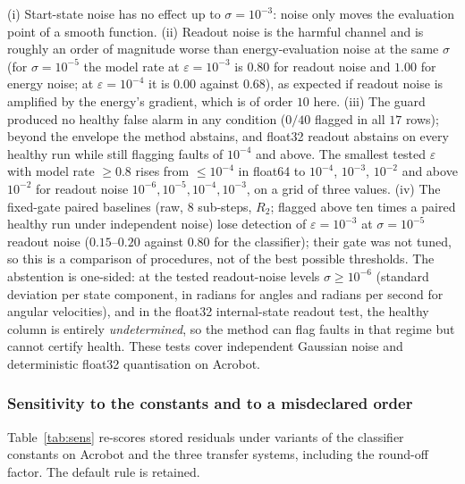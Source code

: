 \documentclass[10pt]{article}
\theoremstyle{definition}
\newcommand{\fittable}[2][\linewidth]{%
  \sbox{\tablebox}{#2}%
  \ifdim\wd\tablebox>#1\relax
    \resizebox{#1}{!}{\usebox{\tablebox}}%
  \else
    \usebox{\tablebox}%
  \fi}
\begin{document}
(i) Start-state noise has no effect up to $\sigma=10^{-3}$: noise only moves the evaluation point of a
smooth function. (ii) Readout noise is the harmful channel and is roughly an order of magnitude worse than
energy-evaluation noise at the same $\sigma$ (for $\sigma=10^{-5}$ the model rate at $\varepsilon=10^{-3}$ is $0.80$ for
readout noise and $1.00$ for energy noise; at $\varepsilon=10^{-4}$ it is $0.00$ against $0.68$), as expected if readout
noise is amplified by the energy's gradient, which is of order $10$ here. (iii) The guard produced no healthy false alarm
in any condition ($0/40$ flagged in all $17$ rows); beyond the envelope the method abstains, and float32 readout abstains
on every healthy run while still flagging faults of $10^{-4}$ and above. The smallest tested $\varepsilon$ with model rate
$\ge0.8$ rises from $\le10^{-4}$ in float64 to $10^{-4}$, $10^{-3}$, $10^{-2}$ and above $10^{-2}$ for readout noise
$10^{-6},10^{-5},10^{-4},10^{-3}$, on a grid of three values. (iv) The fixed-gate paired baselines (raw, 8 sub-steps,
$R_2$; flagged above ten times a paired healthy run under independent noise) lose detection of $\varepsilon=10^{-3}$ at
$\sigma=10^{-5}$ readout noise ($0.15$--$0.20$ against $0.80$ for the classifier); their gate was not tuned, so this is a
comparison of procedures, not of the best possible thresholds. The abstention is one-sided: at the tested readout-noise levels
$\sigma\ge10^{-6}$ (standard deviation per state component, in radians for angles
and radians per second for angular velocities), and in the float32 internal-state
readout test, the healthy column is entirely \emph{undetermined}, so the method can
flag faults in that regime but cannot certify health. These tests cover
independent Gaussian noise and deterministic float32 quantisation on Acrobot.

\subsubsection{Sensitivity to the constants and to a misdeclared order}\label{sec:sens}

Table~\ref{tab:sens} re-scores stored residuals under variants of the
classifier constants on Acrobot and the three transfer systems, including the
round-off factor. The default rule is retained.

\begin{table}[htbp]
\centering\small
\fittable{}
\caption{Variants of the decision rule. Healthy model: healthy runs labelled
\emph{model}; healthy other flag: labelled \emph{order-$k$}; healthy abstain:
\emph{undetermined}, \emph{unstable} or \emph{blowup}. Faults on the transfer
systems are $\varepsilon=10^{-2}$ for $q=2,3,4$; HH adds weak
H\'enon--Heiles faults at $10^{-4}$ for the same orders.}
\label{tab:sens}
\end{table}
\end{document}
